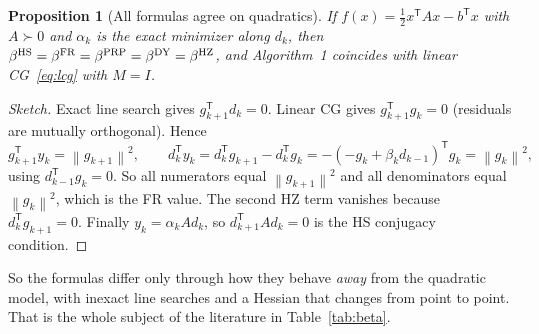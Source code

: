 \documentclass[11pt,a4paper]{article}
\newtheorem{proposition}[theorem]{Proposition}
\theoremstyle{remark}
\newcommand{\norm}[1]{\left\lVert #1\right\rVert}
\newcommand{\ip}[2]{#1^{\mathsf T}#2}
\newcommand{\T}{^{\mathsf T}}
\begin{document}
\begin{proposition}[All formulas agree on quadratics]
If $f(x)=\tfrac12x\T Ax-b\T x$ with $A\succ0$ and $\alpha_k$ is the exact minimizer along $d_k$, then $\beta^{\rm HS}=\beta^{\rm FR}=\beta^{\rm PRP}=\beta^{\rm DY}=\beta^{\rm HZ}$, and Algorithm~1 coincides with linear CG~\eqref{eq:lcg} with $M=I$.
\end{proposition}
\begin{proof}[Sketch]
Exact line search gives $\ip{g_{k+1}}{d_k}=0$. Linear CG gives $\ip{g_{k+1}}{g_k}=0$ (residuals are mutually orthogonal). Hence
\[
\ip{g_{k+1}}{y_k}=\norm{g_{k+1}}^2,\qquad
\ip{d_k}{y_k}=\ip{d_k}{g_{k+1}}-\ip{d_k}{g_k}=-\ip{(-g_k+\beta_kd_{k-1})}{g_k}=\norm{g_k}^2,
\]
using $\ip{d_{k-1}}{g_k}=0$. So all numerators equal $\norm{g_{k+1}}^2$ and all denominators equal $\norm{g_k}^2$, which is the FR value. The second HZ term vanishes because $\ip{d_k}{g_{k+1}}=0$. Finally $y_k=\alpha_kAd_k$, so $\ip{d_{k+1}}{Ad_k}=0$ is the HS conjugacy condition.
\end{proof}

So the formulas differ only through how they behave \emph{away} from the quadratic model, with inexact line searches and a Hessian that changes from point to point. That is the whole subject of the literature in Table~\ref{tab:beta}.
\end{document}
